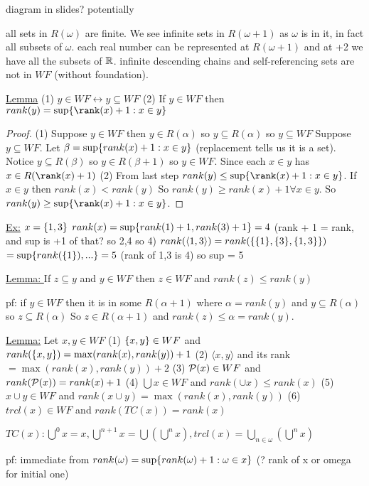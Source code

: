 diagram in slides? potentially

all sets in $R(\omega)$ are finite.
We see infinite sets in $R(\omega+1)$ as $\omega$ is in it, in fact all subsets of $\omega$.
each real number can be represented at $R(\omega+1)$
and at +2 we have all the subsets of $\mathbb R$.
infinite descending chains and self-referencing sets are not in $WF$ (without foundation).

\underline{Lemma}
(1) $y \in WF \leftrightarrow y \subseteq WF$
(2) If $y \in WF$ then $rank(y) = \sup\set{\rank(x) + 1: x \in y}$

\begin{proof}
(1) Suppose $y \in WF$ then $y \in R(\alpha)$ so $y \subseteq R(\alpha)$ so $y \subseteq WF$
    Suppose $y \subseteq WF$.
    Let $\beta = \sup\{rank(x) +1: x \in y\}$ (replacement tells us it is a set).
    Notice $y \subseteq R(\beta)$ so $y \in R(\beta + 1)$ so $y \in WF$.
    Since each $x \in y$ has $x \in R(\rank(x) + 1)$
(2) From last step $rank(y) \leq \sup\set{\rank(x)+1 : x \in y }$.
    If $x \in y  $ then $rank(x) < rank(y)$
    So $rank(y) \geq rank(x) + 1 \forall x \in y$.
    So $rank(y) \geq \sup\set{\rank(x) + 1 : x \in y}$.
    \end{proof}

\underline{Ex:} $x = \{1,3\}$
$rank(x) = \sup\{rank(1) + 1, rank(3) + 1\}=4$  (rank + 1 = rank, and sup is +1 of that? so 2,4 so 4)
$rank(\langle 1,3 \rangle) = rank(\{\{1\},\{3\}, \{1,3\}\})$
$=\sup\{rank(\{1\}),...\}=5$ (rank of 1,3 is 4) so sup = 5

\underline{Lemma: } If $z \subseteq y$ and $y \in WF$
then $z \in WF$ and $rank(z) \leq rank(y)$

pf: if $y \in WF$ then it is in some $R(\alpha+1)$ where $\alpha = rank(y)$ and $y \subseteq R(\alpha)$ so $z \subseteq R(\alpha)$
So $z \in R(\alpha+1)$ and $rank(z) \leq \alpha = rank(y)$.


\underline{Lemma:} Let $x,y \in WF$
(1) $\{x,y\} \in WF$ and $rank(\{x,y\}) = \max(rank(x), rank(y)) + 1$
(2) $\langle x,y \rangle$ and its rank $= \max(rank(x),rank(y)) + 2$
(3) $\mathcal{P}(x) \in WF$ and $rank(\mathcal{P}(x)) = rank(x) + 1$
(4) $\bigcup x \in WF$ and $rank(\cup x) \leq rank(x)$
(5) $x \cup y \in WF$ and $rank(x \cup y) = \max(rank(x),rank(y))$
(6) $trcl(x) \in WF$ and $rank(TC(x)) = rank(x)$

$TC(x) : \bigcup^0 x = x, \bigcup^{n+1} x = \bigcup (\bigcup^n x), trcl(x) = \bigcup_{n \in \omega} (\bigcup^n x) $

pf: immediate from $rank(\omega) = \sup\{rank(\omega) + 1: \omega \in x\} $ (? rank of x or omega for initial one)

